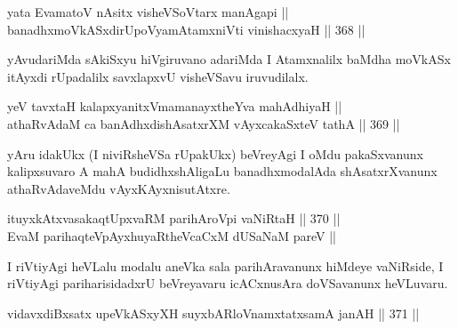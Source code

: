 
\begin{shl}
yata EvamatoV nAsitx visheVSoV\s tarx manAgapi || \\
banadhxmoVkASxdirUpoV\s yamAtamxniVti vinishacxyaH \hfill || 368 ||  
\end{shl}

\begin{artha}
yAvudariMda sAkiSxyu hiVgiruvano adariMda I Atamxnalilx baMdha moVkASx
itAyxdi rUpadalilx savxlapxvU visheVSavu iruvudilalx.
\end{artha}


\begin{shl}
\footnotemark[1]yeV tavxtaH kalapxyanitxVmamanayxtheYva mahAdhiyaH || \\
athaRvAdaM ca banAdhxdishAsatxrXM vAyxcakaSxteV tathA \hfill || 369 ||  
\end{shl}

\begin{artha}
yAru idakUkx (I niviRsheVSa rUpakUkx) beVreyAgi I oMdu
pakaSxvanunx kalipxsuvaro A mahA budidhxshAligaLu banadhxmodalAda
shAsatxrXvanunx athaRvAdaveMdu vAyxKAyxnisutAtxre.
\end{artha}

\begin{shl}
ituyxkAtxvasakaqtUpxvaRM parihAroV\s pi vaNiRtaH \hfill || 370 ||  \\
EvaM parihaqteV\s pAyxhuyaRtheVcaCxM dUSaNaM pareV ||
\end{shl}

\begin{artha}
I riVtiyAgi heVLalu modalu aneVka sala parihAravanunx hiMdeye
vaNiRside, I riVtiyAgi pariharisidadxrU beVreyavaru icACxnusAra
doVSavanunx heVLuvaru.
\end{artha}

\begin{shl}
vidavxdiBxsatx upeVkASxyXH suyxbARloVnamxtatxsamA janAH \hfill || 371 ||  
\end{shl}


